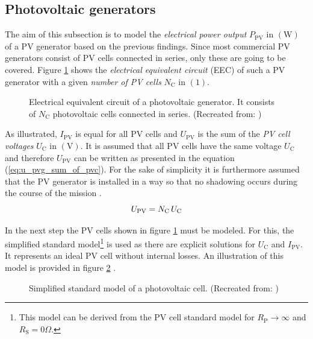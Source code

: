 \subsection{Photovoltaic generators} \label{sec:photovoltaic_generators}
The aim of this subsection is to model the \emph{electrical power output} $P_{\mathrm{PV}}$ in $\left( \mathrm W \right)$ of a PV generator based on the previous findings. Since most commercial PV generators consist of PV cells connected in series, only these are going to be covered. Figure \ref{fig:tikz_PVG_circuit_diagram} shows the \emph{electrical equivalent circuit} (EEC) of such a PV generator with a given \emph{number of PV cells} $N_{\mathrm{C}}$ in $\left( 1 \right)$.
\begin{figure}[h!]
	\centering
	
	\caption{Electrical equivalent circuit of a photovoltaic generator. It consists of $N_{\mathrm{C}}$ photovoltaic cells connected in series. (Recreated from: \cite{Mertens:2015})}
	\label{fig:tikz_PVG_circuit_diagram}
\end{figure}
As illustrated, $I_{\mathrm{PV}}$ is equal for all PV cells and $U_{\mathrm{PV}}$ is the sum of the \emph{PV cell voltages} $U_{\mathrm{C}}$ in $\left( \mathrm{V} \right)$. It is assumed that all PV cells have the same voltage $U_{\mathrm{C}}$ and therefore $U_{\mathrm{PV}}$ can be written as presented in the equation (\ref{eq:u_pvg_sum_of_pvc}). For the sake of simplicity it is furthermore assumed that the PV generator is installed in a way so that no shadowing occurs during the course of the mission \cite{Prechtl:2006, Mertens:2015}.
	\begin{equation} \label{eq:u_pvg_sum_of_pvc}
	\centering
		U_{\mathrm{PV}} = N_{\mathrm{C}} \, U_{\mathrm{C}}
	\end{equation}

In the next step the PV cells shown in figure \ref{fig:tikz_PVG_circuit_diagram} must be modeled. For this, the simplified standard model\footnote{This model can be derived from the PV cell standard model for $R_{\mathrm{P}} \to \infty$ and $R_{\mathrm{S}} = 0\Omega$.} is used as there are explicit solutions for $U_{\mathrm{C}}$ and $I_{\mathrm{PV}}$. It represents an ideal PV cell without internal losses. An illustration of this model is provided in figure \ref{fig:tikz_PVC_simplified} \cite{Mertens:2015, Wagner:2018}.
\begin{figure}[h!]
	\centering
	
	\caption{Simplified standard model of a photovoltaic cell. (Recreated from: \cite{Mertens:2015, Wagner:2018})}
	\label{fig:tikz_PVC_simplified}
\end{figure}


